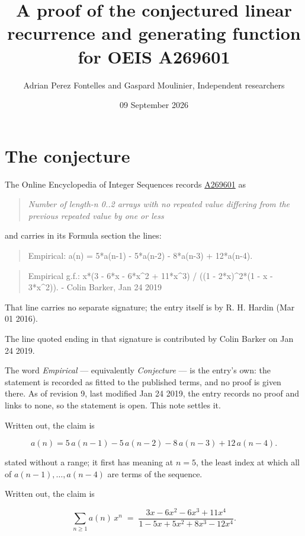 \documentclass[11pt]{article}
\title{A proof of the conjectured linear recurrence and generating function for OEIS A269601}
\author{Adrian Perez Fontelles and Gaspard Moulinier, Independent researchers}
\date{09 September 2026}
\theoremstyle{definition}
\begin{document}
\maketitle
\section{The conjecture}

The Online Encyclopedia of Integer Sequences records \href{https://oeis.org/A269601}{A269601} as

\begin{quote}\itshape Number of length-n 0..2 arrays with no repeated value differing from the previous repeated value by one or less\end{quote}

and carries in its Formula section the lines:

\begin{quote}\ttfamily Empirical: a(n) = 5*a(n-1) - 5*a(n-2) - 8*a(n-3) + 12*a(n-4).\end{quote}

\begin{quote}\ttfamily Empirical g.f.: x*(3 - 6*x - 6*x\textasciicircum{}2 + 11*x\textasciicircum{}3) / ((1 - 2*x)\textasciicircum{}2*(1 - x - 3*x\textasciicircum{}2)). - Colin Barker, Jan 24 2019\end{quote}

That line carries no separate signature; the entry itself is by R. H. Hardin (Mar 01 2016).

The line quoted ending in that signature is contributed by Colin Barker on Jan 24 2019.

The word {\itshape Empirical} --- equivalently {\itshape Conjecture} --- is the entry's own: the statement is recorded as fitted to the published terms, and no proof is given there. As of revision 9, last modified Jan 24 2019, the entry records no proof and links to none, so the statement is open. This note settles it.

Written out, the claim is

\[a(n) = 5\,a(n-1) - 5\,a(n-2) - 8\,a(n-3) + 12\,a(n-4).\]

stated without a range; it first has meaning at $n = 5$, the least index at which all of $a(n-1),\dots,a(n-4)$ are terms of the sequence.

Written out, the claim is

\[\sum_{n \ge 1} a(n)\,x^n \;=\; \frac{3x - 6x^{2} - 6x^{3} + 11x^{4}}{1 - 5x + 5x^{2} + 8x^{3} - 12x^{4}}.\]
\end{document}
